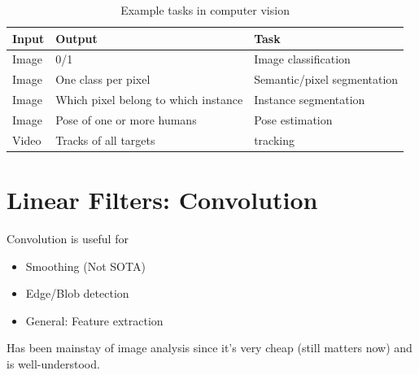 \begin{table}[htpb]
  \centering
  \begin{tabular}{lll}
    \toprule
    Input & Output & Task \\
    \midrule
    Image & 0/1 & Image classification \\
    Image & One class per pixel & Semantic/pixel segmentation \\
    Image & Which pixel belong to which instance & Instance segmentation \\
    Image & Pose of one or more humans & Pose estimation \\
    Video & Tracks of all targets & tracking \\ \bottomrule
  \end{tabular}
  \caption{Example tasks in computer vision}%
  \label{tab:ex:tasks}
\end{table}

\section[Convolution]{Linear Filters: Convolution}
Convolution is useful for
\begin{itemize}
\item Smoothing (Not SOTA)
\item Edge/Blob detection
\item General: Feature extraction
\end{itemize}
Has been mainstay of image analysis since it's very cheap (still matters now)
and is well-understood.

